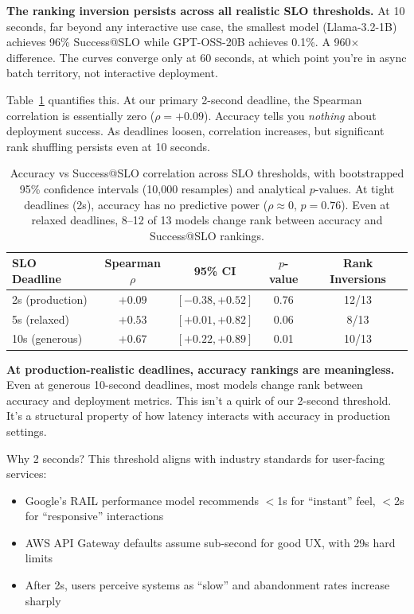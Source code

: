 \documentclass[11pt]{article}
\begin{document}
\textbf{The ranking inversion persists across all realistic SLO thresholds.}
At 10 seconds, far beyond any interactive use case, the smallest model (Llama-3.2-1B) achieves 96\% Success@SLO while GPT-OSS-20B achieves 0.1\%.  A 960$\times$ difference.
The curves converge only at 60 seconds, at which point you're in async batch territory, not interactive deployment.

Table~\ref{tab:slo-correlation} quantifies this.
At our primary 2-second deadline, the Spearman correlation is essentially zero ($\rho = +0.09$).  Accuracy tells you \emph{nothing} about deployment success.
As deadlines loosen, correlation increases, but significant rank shuffling persists even at 10 seconds.

\begin{table}[t]
\centering
\caption{Accuracy vs Success@SLO correlation across SLO thresholds, with bootstrapped 95\% confidence intervals (10{,}000 resamples) and analytical $p$-values.  At tight deadlines (2s), accuracy has no predictive power ($\rho \approx 0$, $p = 0.76$).  Even at relaxed deadlines, 8--12 of 13 models change rank between accuracy and Success@SLO rankings.}
\label{tab:slo-correlation}
\begin{tabular}{lcccc}
\toprule
\textbf{SLO Deadline} & \textbf{Spearman $\rho$} & \textbf{95\% CI} & \textbf{$p$-value} & \textbf{Rank Inversions} \\
\midrule
2s (production) & $+0.09$ & $[-0.38, +0.52]$ & 0.76 & 12/13 \\
5s (relaxed) & $+0.53$ & $[+0.01, +0.82]$ & 0.06 & 8/13 \\
10s (generous) & $+0.67$ & $[+0.22, +0.89]$ & 0.01 & 10/13 \\
\bottomrule
\end{tabular}
\end{table}

\textbf{At production-realistic deadlines, accuracy rankings are meaningless.}
Even at generous 10-second deadlines, most models change rank between accuracy and deployment metrics.
This isn't a quirk of our 2-second threshold.  It's a structural property of how latency interacts with accuracy in production settings.

Why 2 seconds?
This threshold aligns with industry standards for user-facing services:
\begin{itemize}[leftmargin=12pt]
    \item Google's RAIL performance model recommends $<$1s for ``instant'' feel, $<$2s for ``responsive'' interactions
    \item AWS API Gateway defaults assume sub-second for good UX, with 29s hard limits
    \item After 2s, users perceive systems as ``slow'' and abandonment rates increase sharply~\citep{akamai2017performance}
\end{itemize}
\end{document}
